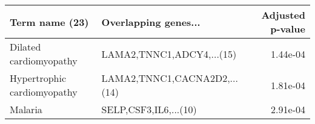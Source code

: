 \begin{tabular}{llr}
\toprule
             Term name (23) &         Overlapping genes... &  Adjusted p-value \\
\midrule
     Dilated cardiomyopathy &    LAMA2,TNNC1,ADCY4,...(15) &          1.44e-04 \\
Hypertrophic cardiomyopathy & LAMA2,TNNC1,CACNA2D2,...(14) &          1.81e-04 \\
                    Malaria &        SELP,CSF3,IL6,...(10) &          2.91e-04 \\
\bottomrule
\end{tabular}
